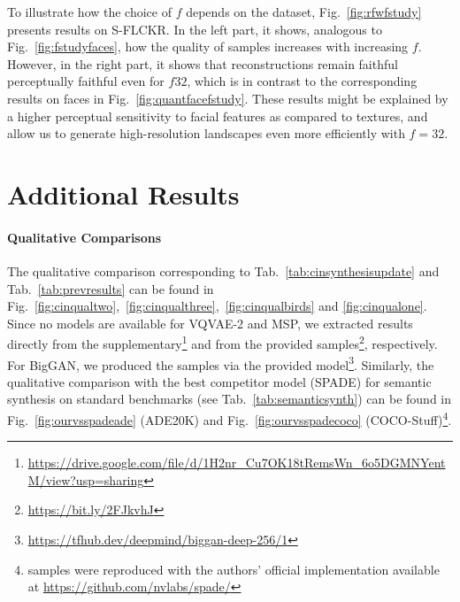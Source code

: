 \documentclass[final]{cvpr}
\begin{document}
To illustrate how the choice of $f$ depends on the dataset,
Fig.~\ref{fig:rfwfstudy} presents results on S-FLCKR.
In the left part, it shows, analogous to Fig.~\ref{fig:fstudyfaces}, how the
quality of samples increases with increasing $f$. However, in the right part, it
shows that reconstructions remain faithful perceptually faithful even for
$f32$, which is in contrast to the corresponding results on faces
in Fig.~\ref{fig:quantfacefstudy}. These results might be explained by a higher
perceptual sensitivity to facial features as compared to textures, and allow us
to generate high-resolution landscapes even more efficiently with $f=32$.
\quantfacefstudy
\vqvaegan
\rfwfstudy

\section{Additional Results}
\label{sec:addition}

\paragraph{Qualitative Comparisons}
The qualitative comparison corresponding to Tab.~\ref{tab:cinsynthesisupdate} and Tab.~\ref{tab:prevresults} can
be found in Fig.~\ref{fig:cinqualtwo},~\ref{fig:cinqualthree},~\ref{fig:cinqualbirds} and
\ref{fig:cinqualone}. Since no models are available for VQVAE-2 and MSP, we
extracted results directly from the
supplementary\footnote{\url{https://drive.google.com/file/d/1H2nr_Cu7OK18tRemsWn_6o5DGMNYentM/view?usp=sharing}}
and from the provided samples\footnote{\url{https://bit.ly/2FJkvhJ}},
respectively. For BigGAN, we produced the samples via the provided
model\footnote{\url{https://tfhub.dev/deepmind/biggan-deep-256/1}}. 
Similarly, the qualitative comparison with the best competitor model (SPADE) for semantic synthesis on standard benchmarks (see Tab.~\ref{tab:semanticsynth}) can be found in Fig.~\ref{fig:ourvsspadeade} (ADE20K) and Fig.~\ref{fig:ourvsspadecoco} (COCO-Stuff)\footnote{samples were reproduced with the authors' official implementation available at \url{https://github.com/nvlabs/spade/}}. 
\end{document}
